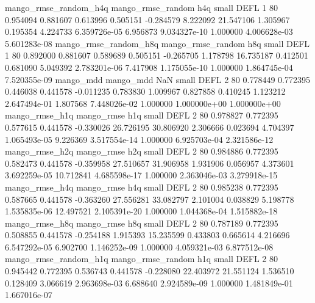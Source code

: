 mango_rmse_random_h4q mango_rmse_random                  h4q      small     DEFL                 1 80 0.954094       0.881607 0.613996       0.505151   -0.284579      8.222092     21.547106     1.305967       0.195354  4.224733 6.359726e-05     6.956873   9.034327e-10            1.000000    4.006628e-03        5.601283e-08
mango_rmse_random_h8q mango_rmse_random                  h8q      small     DEFL                 1 80 0.892000       0.881607 0.589689       0.505151   -0.265705      1.178798     16.735187     0.412501       0.681090  5.049392 2.783201e-06     7.417908   1.175055e-10            1.000000    1.864745e-04        7.520355e-09
            mango_mdd         mango_mdd                  NaN      small     DEFL                 2 80 0.778449       0.772395 0.446038       0.441578   -0.011235      0.783830      1.009967     0.827858       0.410245  1.123212 2.647494e-01     1.807568   7.448026e-02            1.000000    1.000000e+00        1.000000e+00
       mango_rmse_h1q        mango_rmse                  h1q      small     DEFL                 2 80 0.978827       0.772395 0.577615       0.441578   -0.330026     26.726195     30.806920     2.306666       0.023694  4.704397 1.065493e-05     9.226369   3.517554e-14            1.000000    6.925703e-04        2.321586e-12
       mango_rmse_h2q        mango_rmse                  h2q      small     DEFL                 2 80 0.984886       0.772395 0.582473       0.441578   -0.359958     27.510657     31.906958     1.931906       0.056957  4.373601 3.692259e-05    10.712841   4.685598e-17            1.000000    2.363046e-03        3.279918e-15
       mango_rmse_h4q        mango_rmse                  h4q      small     DEFL                 2 80 0.985238       0.772395 0.587665       0.441578   -0.363260     27.556281     33.082797     2.101004       0.038829  5.198778 1.535835e-06    12.497521   2.105391e-20            1.000000    1.044368e-04        1.515882e-18
       mango_rmse_h8q        mango_rmse                  h8q      small     DEFL                 2 80 0.787189       0.772395 0.508855       0.441578   -0.254188      1.915393     15.235599     0.433803       0.665614  4.216696 6.547292e-05     6.902700   1.146252e-09            1.000000    4.059321e-03        6.877512e-08
mango_rmse_random_h1q mango_rmse_random                  h1q      small     DEFL                 2 80 0.945442       0.772395 0.536743       0.441578   -0.228080     22.403972     21.551124     1.536510       0.128409  3.066619 2.963698e-03     6.688640   2.924589e-09            1.000000    1.481849e-01        1.667016e-07
